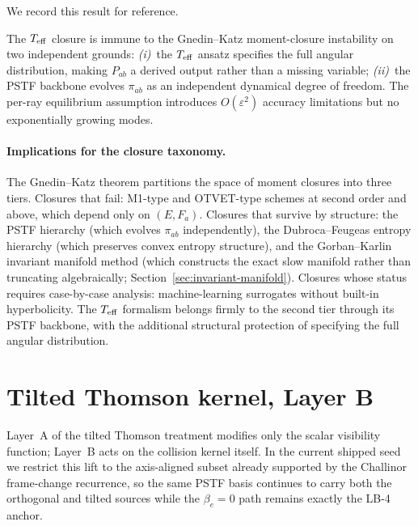We record this result for reference.

\begin{remark}
\label{rem:gnedin-katz}
The $T_{\mathrm{eff}}$ closure is immune to the Gnedin--Katz
moment-closure instability on two independent grounds:
\emph{(i)}~the $T_{\mathrm{eff}}$ ansatz specifies the full
angular distribution, making $P_{ab}$ a derived
output rather than a missing variable;
\emph{(ii)}~the PSTF backbone evolves $\pi_{ab}$ as
an independent dynamical degree of freedom.  The
per-ray equilibrium assumption introduces
$O(\varepsilon^2)$ accuracy limitations but no
exponentially growing modes.
\end{remark}


\paragraph{Implications for the closure taxonomy.}

The Gnedin--Katz theorem partitions the space of
moment closures into three tiers.  Closures that fail:
M1-type and OTVET-type schemes at second order and
above, which depend only on $(E, F_a)$.  Closures
that survive by structure: the PSTF hierarchy
(which evolves $\pi_{ab}$ independently), the
Dubroca--Feugeas entropy hierarchy (which preserves
convex entropy structure), and the Gorban--Karlin
invariant manifold method (which constructs the exact
slow manifold rather than truncating algebraically;
Section~\ref{sec:invariant-manifold}).  Closures whose
status requires case-by-case analysis: machine-learning
surrogates without built-in hyperbolicity.  The $T_{\mathrm{eff}}$
formalism belongs firmly to the second tier through
its PSTF backbone, with the additional structural
protection of specifying the full angular distribution.


\section{Tilted Thomson kernel, Layer B}
\label{sec:tilted-thomson-layer-b}

Layer~A of the tilted Thomson treatment modifies only the
scalar visibility function; Layer~B acts on the collision
kernel itself.  In the current shipped seed we restrict this
lift to the axis-aligned subset already supported by the
Challinor frame-change recurrence, so the same PSTF basis
continues to carry both the orthogonal and tilted sources while
the $\beta_e = 0$ path remains exactly the LB-4 anchor.


